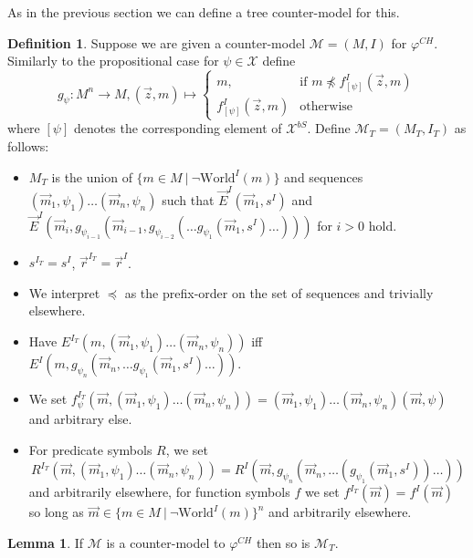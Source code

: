 \documentclass{easychair}
\theoremstyle{definition}
\theoremstyle{definition}
\theoremstyle{definition}
\newtheorem{lemma}[theorem]{Lemma}
\theoremstyle{definition}
\theoremstyle{definition}
\newtheorem{definition}[theorem]{Definition}
\theoremstyle{definition}
\theoremstyle{definition}
\begin{document}
As in the previous section we can define a tree counter-model for this.
\begin{definition}
	Suppose we are given a counter-model $\mathcal M = (M, I)$ for $\varphi^{CH}$. Similarly to the propositional case for $\psi\in\mathcal X$ define \[g_\psi :M^n\to M, (\vec z, m) \mapsto
	\begin{cases} 
	m,&\text{if }m\not\preceq f_{[\psi]}^I(\vec z, m)\\
	f_{[\psi]}^I(\vec z, m)&\text{otherwise}
	\end{cases}
	\]where $[\psi]$ denotes the corresponding element of $\mathcal X^{bS}$. Define $\mathcal M_T = (M_T, I_T)$ as follows:
	\begin{itemize}\addtolength{\itemsep}{-5pt}
		\item $M_T$ is the union of $\{m\in M\:|\:\neg\text{World}^I(m)\}$ and sequences $(\vec m_1, \psi_1)\dots (\vec m_n, \psi_n)$ such that $\vec E^I(\vec m_1, s^I)$ and $\vec E^I(\vec m_i, g_{\psi_{i-1}}(\vec m_{i-1}, g_{\psi_{i-2}}(\dots g_{\psi_1}(\vec m_1, s^I)\dots)))$ for $i > 0$ hold.
		\item $s^{I_T} = s^I$, $\vec r^{I_T} = \vec r^I$.
		\item We interpret $\preceq$ as the prefix-order on the set of sequences and trivially elsewhere.
		\item Have $E^{I_T}(m, (\vec m_1, \psi_1)\dots (\vec m_n, \psi_n))$ iff $E^I(m, g_{\psi_n}(\vec m_n, \dots g_{\psi_1}(\vec m_1, s^I)\dots))$.
		\item We set $f_\psi^{I_T}(\vec m, (\vec m_1, \psi_1)\dots (\vec m_n, \psi_n)) = (\vec m_1, \psi_1)\dots (\vec m_n, \psi_n)(\vec m, \psi)$ and arbitrary else.
		\item For predicate symbols $R$, we set $${R}^{I_T}(\vec m, (\vec m_1, \psi_1)\dots (\vec m_n, \psi_n)) = {R}^I(\vec m, g_{\psi_n}(\vec m_n, \dots(g_{\psi_1}(\vec m_1, s^I))\dots))$$ and arbitrarily elsewhere, for function symbols $f$ we set $f^{I_T}(\vec m) = f^I(\vec m)$ so long as $\vec m\in \{m\in M\:|\:\neg\text{World}^I(m)\}^n$ and arbitrarily elsewhere.
	\end{itemize}
\end{definition}

\begin{lemma}
	If $\mathcal M$ is a counter-model to $\varphi^{CH}$ then so is $\mathcal M_T$.
\end{lemma}
\end{document}

